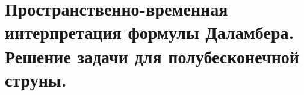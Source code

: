 \chapter{Пространственно-временная интерпретация формулы Даламбера. Решение
задачи для полубесконечной струны.}

\newpage

